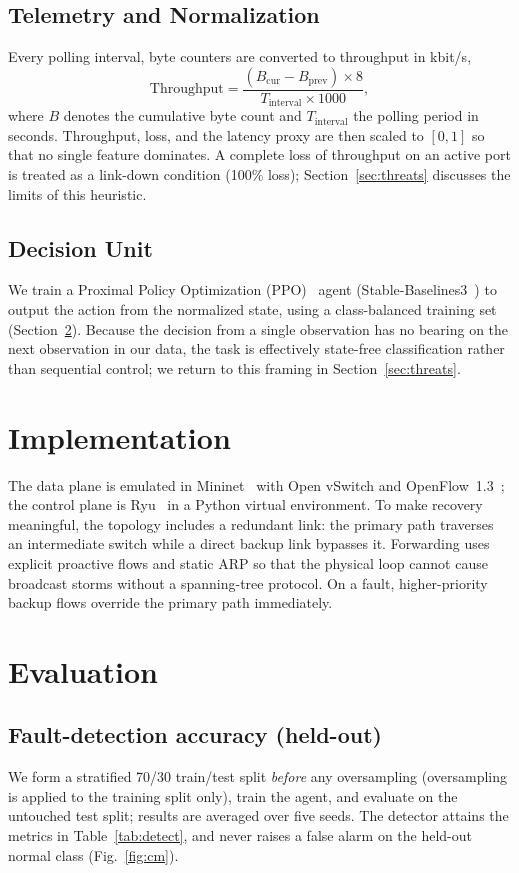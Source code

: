 \documentclass[conference]{IEEEtran}
\begin{document}
\subsection{Telemetry and Normalization}
Every polling interval, byte counters are converted to throughput in kbit/s,
\begin{equation}
\text{Throughput} = \frac{(B_{\text{cur}} - B_{\text{prev}})\times 8}
{T_{\text{interval}}\times 1000},
\end{equation}
where $B$ denotes the cumulative byte count and $T_{\text{interval}}$ the polling
period in seconds. Throughput, loss, and the latency proxy are then scaled to
$[0,1]$ so that no single feature dominates. A complete loss of throughput on an active port is treated as a
link-down condition (100\% loss); Section~\ref{sec:threats} discusses the limits of
this heuristic.

\subsection{Decision Unit}
We train a Proximal Policy Optimization (PPO)~\cite{schulman2017ppo} agent
(Stable-Baselines3~\cite{raffin2021sb3}) to output the action from the
normalized state, using a class-balanced training set (Section~\ref{sec:eval}).
Because the decision from a single observation has no bearing on the next
observation in our data, the task is effectively state-free classification rather
than sequential control; we return to this framing in Section~\ref{sec:threats}.

\section{Implementation}
The data plane is emulated in Mininet~\cite{lantz2010mininet} with Open vSwitch and
OpenFlow~1.3~\cite{onf2012openflow}; the control plane is Ryu~\cite{ryu} in a Python
virtual environment. To make recovery meaningful,
the topology includes a redundant link: the primary path traverses an intermediate
switch while a direct backup link bypasses it. Forwarding uses explicit proactive
flows and static ARP so that the physical loop cannot cause broadcast storms
without a spanning-tree protocol. On a fault, higher-priority backup flows override
the primary path immediately.

\section{Evaluation}
\label{sec:eval}
\subsection{Fault-detection accuracy (held-out)}
We form a stratified 70/30 train/test split \emph{before} any oversampling
(oversampling is applied to the training split only), train the agent, and evaluate
on the untouched test split; results are averaged over five seeds. The detector
attains the metrics in Table~\ref{tab:detect}, and never raises a false alarm on
the held-out normal class (Fig.~\ref{fig:cm}). %
\end{document}
